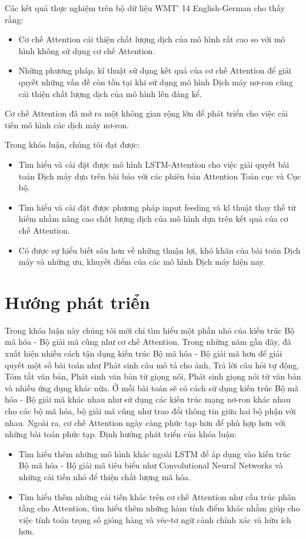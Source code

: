 Các kết quả thực nghiệm trên bộ dữ liệu WMT' 14 English-German cho thấy rằng:
\begin{itemize}
	\item Cơ chế Attention cải thiện chất lượng dịch của mô hình rất cao so với mô hình không sử dụng cơ chế Attention.
	\item Những phương pháp, kĩ thuật sử dụng kết quả của cơ chế Attention để giải quyết những vấn đề còn tồn tại khi sử dụng mô hình Dịch máy nơ-ron cũng cải thiện chất lượng dịch của mô hình lên đáng kể.
\end{itemize}

Cơ chế Attention đã mở ra một không gian rộng lớn để phát triển cho việc cải tiến mô hình các dịch máy nơ-ron.

Trong khóa luận, chúng tôi đạt được:
\begin{itemize}
	\item Tìm hiểu và cài đặt được mô hình LSTM-Attention cho việc giải quyết bài toán Dịch máy dựa trên bài báo \cite{attentionThangLuong2015} với các phiên bản Attention Toàn cục và Cục bộ.
	\item Tìm hiểu và cài đặt được phương pháp input feeding và kĩ thuật thay thế từ hiếm nhằm nâng cao chất lượng dịch của mô hình dựa trên kết quả của cơ chế Attention.
	\item Có được sự hiểu biết sâu hơn về những thuận lợi, khó khăn của bài toán Dịch máy và những ưu, khuyết điểm của các mô hình Dịch máy hiện nay.
\end{itemize}

\section{Hướng phát triển}
Trong khóa luận này chúng tôi mới chỉ tìm hiểu một phần nhỏ của kiến trúc Bộ mã hóa - Bộ giải mã cũng như cơ chế Attention. Trong những năm gần đây, đã xuất hiện nhiều cách tận dụng kiến trúc Bộ mã hóa - Bộ giải mã hơn để giải quyết một số bài toán như Phát sinh câu mô tả cho ảnh, Trả lời câu hỏi tự động, Tóm tắt văn bản, Phát sinh văn bản từ giọng nói, Phát sinh giọng nói từ văn bản và nhiều ứng dụng khác nữa. Ở mỗi bài toán sẽ có cách sử dụng kiến trúc Bộ mã hóa - Bộ giải mã khác nhau như sử dụng các kiến trúc mạng nơ-ron khác nhau cho các bộ mã hóa, bộ giải mã cũng như trao đổi thông tin giữa hai bộ phận với nhau. Ngoài ra, cơ chế Attention ngày càng phức tạp hơn để phù hợp hơn với những bài toán phức tạp. Định hướng phát triển của khóa luận:
\begin{itemize}
	\item Tìm hiểu thêm những mô hình khác ngoài LSTM để áp dụng vào kiến trúc Bộ mã hóa - Bộ giải mã tiêu biểu như Convolutional Neural Networks và những cải tiến nhỏ để thiện chất lượng mã hóa.
	\item Tìm hiểu thêm những cải tiến khác trên cơ chế Attention như cấu trúc phân tầng cho Attention, tìm hiểu thêm những hàm tính điểm khác nhằm giúp cho việc tính toán trọng số gióng hàng và véc-tơ ngữ cảnh chính xác và hữu ích hơn. 
\end{itemize}



